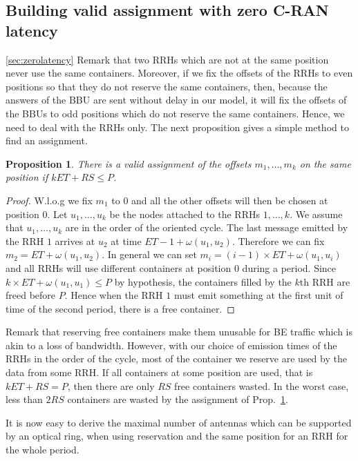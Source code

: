 \documentclass[10pt, conference, letterpaper]{IEEEtran}
\newtheorem{prop}{Proposition}
\begin{document}
 \subsection{Building valid assignment with zero C-RAN latency}\ref{sec:zerolatency}
Remark that two RRHs which are not at the same position never use the same containers. Moreover, if we fix the offsets of the RRHs to even positions so that they do not reserve the same containers, then, because the answers of the BBU are sent without delay in our model, it will fix the offsets of the BBUs to odd positions which do not reserve the same containers. Hence, we need to deal with the RRHs only.
The next proposition gives a simple method to find an assignment.

\begin{prop}
\label{prop:assign}
There is a valid assignment of the offsets $m_1, \dots, m_k$ on the same position if  $k ET + RS \leq P$.
\end{prop}
\begin{proof}
 W.l.o.g we fix $m_1$ to $0$ and all the other offsets will then be chosen at position $0$.  Let $u_1,\dots,u_k$ be the nodes attached to the RRHs $1,\dots,k$. We assume that $u_1,\dots,u_k$ are in the order of the oriented cycle. The last message emitted by the RRH $1$ arrives at $u_2$ at time $ET - 1 + \omega(u_1,u_2)$. Therefore we can fix $m_2 =  ET  + \omega(u_1,u_2)$. In general we can set $m_i = (i-1) \times ET + \omega(u_1,u_i)$ and all RRHs will use different containers at position $0$ during a period. Since $k \times ET + \omega(u_1,u_1) \leq P$ by hypothesis,
 the containers filled by the $k$th RRH are freed before $P$. Hence when the RRH $1$ must emit something at the first unit of time of the second period, there is a free container.
\end{proof}

Remark that reserving free containers make them unusable for BE traffic which is akin to a loss of bandwidth. However, with our choice of emission times of the RRHs in the order of the cycle, most of the container we reserve are used by the data from some RRH. If all containers at some position are used, that is $kET +RS = P$, then there are only $RS$ free containers wasted. In the worst case, less than $2RS$ containers are wasted by the assignment of Prop.~\ref{prop:assign}. 

It is now easy to derive the maximal number of antennas which can be supported by an optical ring, when using reservation and the same position for an RRH for the whole period.
\end{document}
